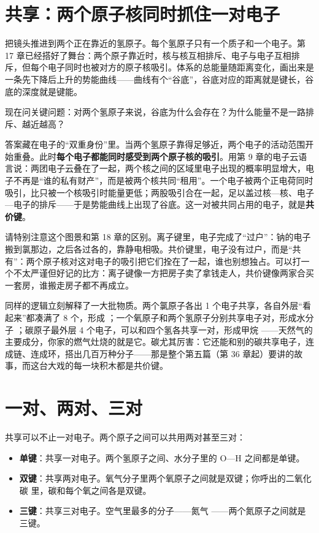 \section{共享：两个原子核同时抓住一对电子}

把镜头推进到两个正在靠近的氢原子。每个氢原子只有一个质子和一个电子。第 17 章已经搭好了舞台：两个原子靠近时，核与核互相排斥、电子与电子互相排斥，但每个电子同时也被对方的原子核吸引。体系的总能量随距离变化，画出来是一条先下降后上升的势能曲线——曲线有个“谷底”，谷底对应的距离就是键长，谷底的深度就是键能。

现在问关键问题：对两个氢原子来说，谷底为什么会存在？为什么能量不是一路排斥、越近越高？

答案藏在电子的“双重身份”里。当两个氢原子靠得足够近，两个电子的活动范围开始重叠。此时\textbf{每个电子都能同时感受到两个原子核的吸引}。用第 9 章的电子云语言说：两团电子云叠在了一起，两个核之间的区域里电子出现的概率明显增大，电子不再是“谁的私有财产”，而是被两个核共同“租用”。一个电子被两个正电荷同时吸引，比只被一个核吸引时能量更低；两股吸引合在一起，足以盖过核—核、电子—电子的排斥——于是势能曲线上出现了谷底。这一对被共同占用的电子，就是\textbf{共价键}。

请特别注意这个图景和第 18 章的区别。离子键里，电子完成了“过户”：钠的电子搬到氯那边，之后各过各的，靠静电相吸。共价键里，电子没有过户，而是“共有”：两个原子核对这对电子的吸引把它们拴在了一起，谁也别想独占。可以打一个不太严谨但好记的比方：离子键像一方把房子卖了拿钱走人，共价键像两家合买一套房，谁搬走房子都不再成立。

同样的逻辑立刻解释了一大批物质。两个氯原子各出 1 个电子共享，各自外层“看起来”都凑满了 8 个，形成 ；一个氧原子和两个氢原子分别共享电子对，形成水分子 ；碳原子最外层 4 个电子，可以和四个氢各共享一对，形成甲烷 ——天然气的主要成分，你家的燃气灶烧的就是它。碳尤其厉害：它还能和别的碳共享电子，连成链、连成环，搭出几百万种分子——那是整个第五篇（第 36 章起）要讲的故事，而这台大戏的每一块积木都是共价键。

\section{一对、两对、三对}

共享可以不止一对电子。两个原子之间可以共用两对甚至三对：

\begin{itemize}[itemsep=2pt]
\item \textbf{单键}：共享一对电子。两个氢原子之间、水分子里的 O—H 之间都是单键。
\item \textbf{双键}：共享两对电子。氧气分子里两个氧原子之间就是双键；你呼出的二氧化碳  里，碳和每个氧之间各是双键。
\item \textbf{三键}：共享三对电子。空气里最多的分子——氮气 ——两个氮原子之间就是三键。
\end{itemize}

